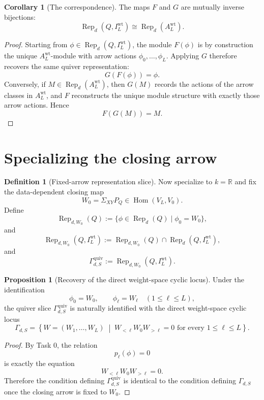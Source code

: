 \documentclass{article}
\newcommand{\R}{\mathbb{R}}
\newcommand{\Hom}{\operatorname{Hom}}
\newcommand{\Rep}{\operatorname{Rep}}
\theoremstyle{definition}
\newtheorem{proposition}[theorem]{Proposition}
\newtheorem{corollary}[theorem]{Corollary}
\newtheorem{definition}[theorem]{Definition}
\begin{document}
\begin{corollary}[The correspondence]
The maps $F$ and $G$ are mutually inverse bijections:
\[
\Rep_d(Q,I_L^{\mathrm{wt}})
\cong
\Rep_d(A_L^{\mathrm{wt}}).
\]
\end{corollary}

\begin{proof}
Starting from $\phi\in \Rep_d(Q,I_L^{\mathrm{wt}})$, the module $F(\phi)$ is by
construction the unique $A_L^{\mathrm{wt}}$-module with arrow actions
$\phi_0,\dots,\phi_L$. Applying $G$ therefore recovers the same quiver
representation:
\[
G(F(\phi))=\phi.
\]
Conversely, if $M\in \Rep_d(A_L^{\mathrm{wt}})$, then $G(M)$ records the actions
of the arrow classes in $A_L^{\mathrm{wt}}$, and $F$ reconstructs the unique
module structure with exactly those arrow actions. Hence
\[
F(G(M))=M.
\]
\end{proof}

\section{Specializing the closing arrow}

\begin{definition}[Fixed-arrow representation slice]
Now specialize to $k=\R$ and fix the data-dependent closing map
\[
W_0=\Sigma_{XY}P_Q\in \Hom(V_L,V_0).
\]
Define
\[
\Rep_{d,W_0}(Q)
:=
\{\phi\in \Rep_d(Q)\mid \phi_0=W_0\},
\]
and
\[
\Rep_{d,W_0}(Q,I_L^{\mathrm{wt}})
:=
\Rep_{d,W_0}(Q)\cap \Rep_d(Q,I_L^{\mathrm{wt}}),
\]
and
\[
\Gamma_{d,S}^{\mathrm{quiv}}
:=
\Rep_{d,W_0}(Q,I_L^{\mathrm{wt}}).
\]
\end{definition}

\begin{proposition}[Recovery of the direct weight-space cyclic locus]
Under the identification
\[
\phi_0=W_0,
\qquad
\phi_\ell=W_\ell
\quad
(1\le \ell\le L),
\]
the quiver slice $\Gamma_{d,S}^{\mathrm{quiv}}$ is naturally identified with the
direct weight-space cyclic locus
\[
\Gamma_{d,S}
=
\left\{
W=(W_1,\dots,W_L)
\;\middle|\;
W_{<\ell}W_0W_{>\ell}=0
\text{ for every } 1\le \ell\le L
\right\}.
\]
\end{proposition}

\begin{proof}
By Task 0, the relation
\[
p_\ell(\phi)=0
\]
is exactly the equation
\[
W_{<\ell}W_0W_{>\ell}=0.
\]
Therefore the condition defining $\Gamma_{d,S}^{\mathrm{quiv}}$ is identical to
the condition defining $\Gamma_{d,S}$ once the closing arrow is fixed to $W_0$.
\end{proof}
\end{document}
